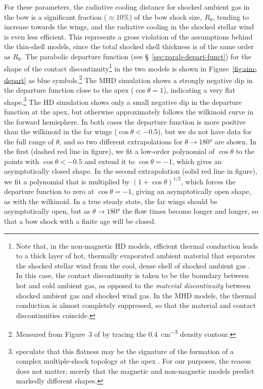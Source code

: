 For these parameters, the radiative cooling distance for shocked
ambient gas in the bow is a significant fraction (\(\approx 10\%\)) of the
bow shock size, \(R_0\), tending to increase towards the wings, and
the radiative cooling in the shocked stellar wind is even less
efficient.  This represents a gross violation of the assumptions
behind the thin-shell models, since the total shocked shell thickness
is of the same order as \(R_0\).  The parabolic departure function
(see \S~\ref{sec:parab-depart-funct}) for the shape of the contact
discontinuity\footnote{%
  Note that, in the non-magnetic HD models, efficient thermal
  conduction leads to a thick layer of hot, thermally evaporated
  ambient material that separates the shocked stellar wind from the
  cool, dense shell of shocked ambient gas \citep[see \S~3.3
  of][]{Meyer:2014b}.  In this case, the contact discontinuity is
  taken to be the boundary between hot and cold ambient gas, as
  opposed to the \textit{material discontinuity} between shocked
  ambient gas and shocked wind gas.  In the MHD models, the thermal
  conduction is almost completely suppressed, so that the material and
  contact discontinuities coincide. } %
in the two models is shown in Figure~\ref{fig:sim-depart} as blue
symbols.\footnote{%
  Measured from Figure~3 of \citet{Meyer:2017a} by tracing the
  \SI{0.4}{cm^{-3}} density contour.} %
The MHD simulation shows a strongly negative dip in the departure
function close to the apex (\(\cos \theta = 1\)), indicating a very flat
shape.\footnote{%
  \citet{Meyer:2017a} speculate that this flatness may be the
  signature of the formation of a complex multiple-shock topology at
  the apex \citep{de-Sterck:1999a}.  For our purposes, the reason does
  not matter, merely that the magnetic and non-magnetic models predict
  markedly different shapes. } %
The HD simulation shows only a small negative dip in the departure
function at the apex, but otherwise approximately follows the
wilkinoid curve in the forward hemisphere.  In both cases the
departure function is more positive than the wilkinoid in the far
wings (\(\cos \theta < -0.5\)), but we do not have data for the full range
of \(\theta\), and so two different extrapolations for
\(\theta \to \ang{180}\) are shown.  In the first (dashed red line in
figure), we fit a low-order polynomial of \(\cos \theta\) to the points
with \(\cos \theta < -0.5\) and extend it to \(\cos \theta = -1\), which gives
an asymptotically closed shape.  In the second extrapolation (solid
red line in figure), we fit a polynomial that is multiplied by
\((1 + \cos\theta)^{1/2}\), which forces the departure function to zero at
\(\cos \theta = -1\), giving an asymptotically open shape, as with the
wilkinoid.  In a true steady state, the far wings should be
asymptotically open, but as \(\theta \to \ang{180}\) the flow times become
longer and longer, so that a bow shock with a finite age will be
closed.

